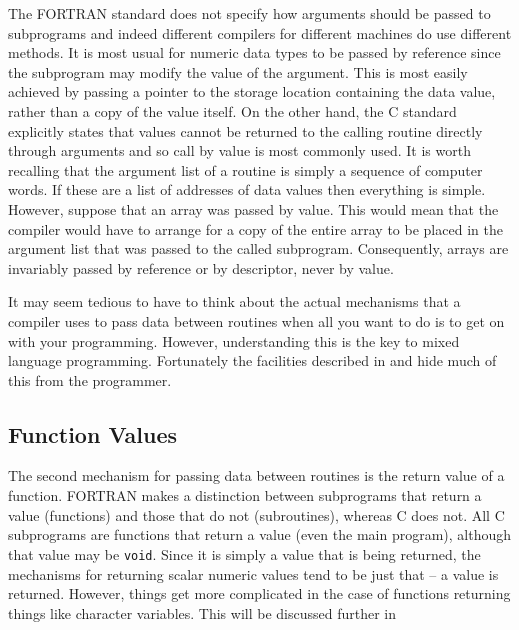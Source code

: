 \documentclass[twoside,11pt,nolof]{starlink}
\begin{document}
The FORTRAN standard does not specify how arguments should be passed to
subprograms and indeed different compilers for different machines do use
different methods. It is most usual for numeric data types to be passed by
reference since the subprogram may modify the value of the argument. This is
most easily achieved by passing a pointer to the storage location containing
the data value, rather than a copy of the value itself. On the other hand, the
C standard explicitly states that values cannot be returned to the calling
routine directly through arguments and so call by value is most commonly used.
It is worth recalling that the argument list of a routine is simply a sequence
of computer words. If these are a list of addresses of data values then
everything is simple. However, suppose that an array was passed by value. This
would mean that the compiler would have to arrange for a copy of the entire
array to be placed in the argument list that was passed to the called
subprogram. Consequently, arrays are invariably passed by reference or by
descriptor, never by value.

It may seem tedious to have to think about the actual mechanisms that a
compiler uses to pass data between routines when all you want to do is to get
on with your programming. However, understanding this is the key to mixed
language programming. Fortunately the facilities described in
 and
 hide much of this from the programmer.

\subsection{Function Values}

The second mechanism for passing data between routines is the return value of a
function. FORTRAN makes a distinction between subprograms that return a value
(functions) and those that do not (subroutines), whereas C does not. All C
subprograms are functions that return a value (even the main program), although
that value may be \texttt{void}. Since it is simply a value that is being
returned, the mechanisms for returning scalar numeric values tend to be just
that -- a value is returned.
However, things get more complicated in the case of
functions returning things like character variables. This will be discussed
further in 
\end{document}
